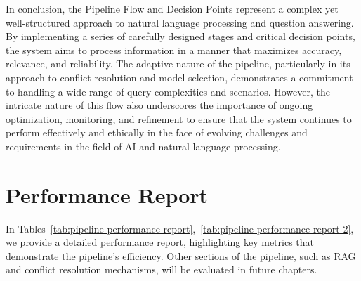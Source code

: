 In conclusion, the Pipeline Flow and Decision Points represent a complex yet well-structured approach to natural language processing and question answering.
By implementing a series of carefully designed stages and critical decision points, the system aims to process information in a manner that maximizes accuracy, relevance, and reliability.
The adaptive nature of the pipeline, particularly in its approach to conflict resolution and model selection, demonstrates a commitment to handling a wide range of query complexities and scenarios.
However, the intricate nature of this flow also underscores the importance of ongoing optimization, monitoring, and refinement to ensure that the system continues to perform effectively and ethically in the face of evolving challenges and requirements in the field of AI and natural language processing.
\section{Performance Report}\label{sec:performance-report}
In Tables~\ref{tab:pipeline-performance-report},~\ref{tab:pipeline-performance-report-2}, we provide a detailed performance report, highlighting key metrics that demonstrate the pipeline's efficiency.
Other sections of the pipeline, such as RAG and conflict resolution mechanisms, will be evaluated in future chapters.
\begin{table}[ht!]
    \noindent
    \caption{Performance of our LLM-based tasks in production, generated by Openlit~\footnote{\url{https://openlit.io/}} with \textit{Gemma2} model.}
    \label{tab:pipeline-performance-report}
\end{table}


